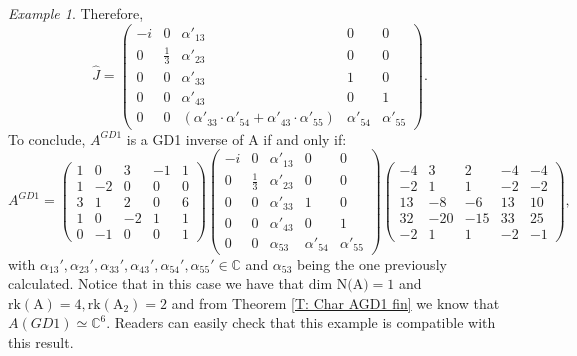 \documentclass[10pt,a4paper]{amsart}
\theoremstyle{plain}
\theoremstyle{remark}
\newtheorem{exam}{Example}
\numberwithin{equation}{section} \numberwithin{defn}{section}
\begin{document}
\begin{exam}
Therefore, $$\hat{J}=\begin{pmatrix}
-i & 0 & \alpha'_{13} & 0 & 0 \\
0 & \frac{1}{3} & \alpha'_{23} & 0 & 0 \\
0 & 0 & \alpha'_{33} & 1 & 0 \\
0 & 0 & \alpha'_{43} & 0 & 1 \\
0 & 0 & (\alpha'_{33}\cdot \alpha'_{54}+\alpha'_{43}\cdot \alpha'_{55}) & \alpha'_{54} & \alpha'_{55}
\end{pmatrix}. $$ To conclude, $A^{GD1}$ is a GD1 inverse of A if and only if: $$A^{GD1}= \begin{pmatrix}
1 & 0 & 3 & -1 & 1 \\
1 & -2 & 0 & 0 & 0 \\
3 & 1 & 2 & 0 & 6 \\
1 & 0 & -2 & 1 & 1 \\
0 & -1 & 0 & 0 & 1
\end{pmatrix} \begin{pmatrix}
-i & 0 & \alpha'_{13} & 0 & 0 \\
0 & \frac{1}{3} & \alpha'_{23} & 0 & 0 \\
0 & 0 & \alpha'_{33} & 1 & 0 \\
0 & 0 & \alpha'_{43} & 0 & 1 \\
0 & 0 & \alpha_{53} & \alpha'_{54} & \alpha'_{55}
\end{pmatrix}  \begin{pmatrix}
-4 & 3 & 2 & -4 & -4 \\
-2 & 1 & 1 & -2 & -2 \\
13 & -8 & -6 & 13 & 10 \\
32 & -20 & -15 & 33 & 25 \\
-2 & 1 & 1 & -2 & -1
\end{pmatrix},$$  with $\alpha_{13}',\alpha_{23}',\alpha_{33}',\alpha_{43}',\alpha_{54}',\alpha_{55}' \in \mathbb{C}$ and $\alpha_{53}$ being the one  previously calculated. Notice that in this case we have that $\text{dim N(A)}=1$ and $\mathrm{rk(A)}=4, \mathrm{rk(A_2)}=2$ and from Theorem \ref{T: Char AGD1 fin} we know that $A(GD1)\simeq \mathbb{C}^6$. Readers can easily check that this example is compatible with this result.
\end{exam}
\end{document}
